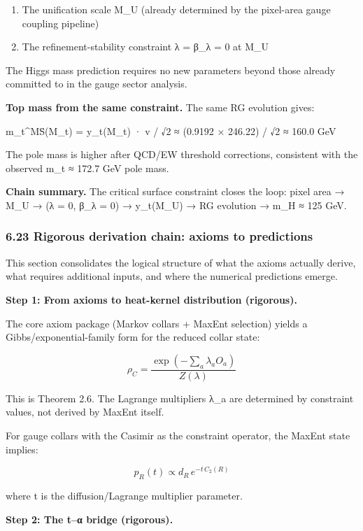 \begin{enumerate}
\def\labelenumi{\arabic{enumi}.}
\tightlist
\item
  The unification scale M\_U (already determined by the pixel-area gauge coupling pipeline)
\item
  The refinement-stability constraint λ = β\_λ = 0 at M\_U
\end{enumerate}

The Higgs mass prediction requires no new parameters beyond those already committed to in the gauge sector analysis.

\textbf{Top mass from the same constraint.} The same RG evolution gives:

m\_t\^{}M\={S}(M\_t) = y\_t(M\_t) · v / √2 ≈ (0.9192 × 246.22) / √2 ≈ 160.0 GeV

The pole mass is higher after QCD/EW threshold corrections, consistent with the observed m\_t ≈ 172.7 GeV pole mass.

\textbf{Chain summary.} The critical surface constraint closes the loop: pixel area → M\_U → (λ = 0, β\_λ = 0) → y\_t(M\_U) → RG evolution → m\_H ≈ 125 GeV.

\subsubsection{6.23 Rigorous derivation chain: axioms to predictions}\label{623-rigorous-derivation-chain-axioms-to-predictions}

This section consolidates the logical structure of what the axioms actually derive, what requires additional inputs, and where the numerical predictions emerge.

\textbf{Step 1: From axioms to heat-kernel distribution (rigorous).}

The core axiom package (Markov collars + MaxEnt selection) yields a Gibbs/exponential-family form for the reduced collar state:

\[
\rho_C = \frac{\exp(-\sum_a \lambda_a O_a)}{Z(\lambda)}
\]

This is Theorem 2.6. The Lagrange multipliers λ\_a are determined by constraint values, not derived by MaxEnt itself.

For gauge collars with the Casimir as the constraint operator, the MaxEnt state implies:

\[
p_R(t) \propto d_R \, e^{-t \, C_2(R)}
\]

where t is the diffusion/Lagrange multiplier parameter.

\textbf{Step 2: The t--α bridge (rigorous).}

